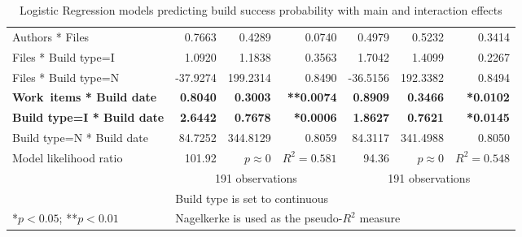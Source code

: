 \documentclass[12pt,oneside]{book}
\begin{document}
\begin{table}
\begin{center}
\begin{tabular}{l|rrr|rrr}
Authors * Files             &   0.7663 &   0.4289 & 0.0740 &    0.4979 &    0.5232 &   0.3414 \\
Files * Build type=I              &   1.0920 &   1.1838 & 0.3563 &    1.7042 &    1.4099 &   0.2267 \\
Files * Build type=N              & -37.9274 & 199.2314 & 0.8490 &  -36.5156 &  192.3382 &   0.8494 \\
\textbf{Work~items * Build date}       &   \textbf{0.8040} &   \textbf{0.3003} & \textbf{**0.0074} &    \textbf{0.8909} &    \textbf{0.3466} &   \textbf{*0.0102} \\
\textbf{Build type=I * Build date}          &   \textbf{2.6442} &   \textbf{0.7678} & \textbf{*0.0006} &    \textbf{1.8627} &    \textbf{0.7621} &   \textbf{*0.0145} \\
Build type=N * Build date          &  84.7252 & 344.8129 & 0.8059 &   84.3117 &  341.4988 &   0.8050 \\
	\hline
Model likelihood ratio & 101.92 & $p \approx 0$ & $R^2=0.581$ & 94.36 & $p \approx 0$ &	$R^2 = 0.548$ \\
& \multicolumn{3}{c}{191 observations} & \multicolumn{3}{c}{191 observations} \\
\multicolumn{1}{l}{ } & \multicolumn{6}{l}{\scriptsize{Build type is set to continuous}} \\
\multicolumn{1}{l}{\scriptsize{*$p < 0.05$; **$p < 0.01$}} & \multicolumn{6}{l}{\scriptsize{Nagelkerke is used as the pseudo-$R^2$ measure}}
\end{tabular}
\end{center}
\caption{Logistic Regression models predicting build success probability with main and interaction effects}
\label{tab:logr}
\end{table}
\end{document}
